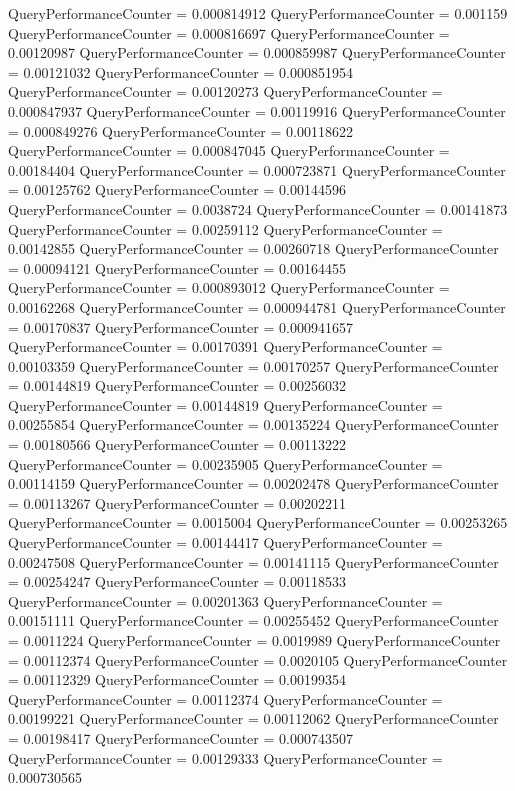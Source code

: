 \documentclass[9pt]{article}
\theoremstyle{plain}
\theoremstyle{definition}
\theoremstyle{remark}
\numberwithin{equation}{section}
\begin{document}
QueryPerformanceCounter  =  0.000814912
QueryPerformanceCounter  =  0.001159
QueryPerformanceCounter  =  0.000816697
QueryPerformanceCounter  =  0.00120987
QueryPerformanceCounter  =  0.000859987
QueryPerformanceCounter  =  0.00121032
QueryPerformanceCounter  =  0.000851954
QueryPerformanceCounter  =  0.00120273
QueryPerformanceCounter  =  0.000847937
QueryPerformanceCounter  =  0.00119916
QueryPerformanceCounter  =  0.000849276
QueryPerformanceCounter  =  0.00118622
QueryPerformanceCounter  =  0.000847045
QueryPerformanceCounter  =  0.00184404
QueryPerformanceCounter  =  0.000723871
QueryPerformanceCounter  =  0.00125762
QueryPerformanceCounter  =  0.00144596
QueryPerformanceCounter  =  0.0038724
QueryPerformanceCounter  =  0.00141873
QueryPerformanceCounter  =  0.00259112
QueryPerformanceCounter  =  0.00142855
QueryPerformanceCounter  =  0.00260718
QueryPerformanceCounter  =  0.00094121
QueryPerformanceCounter  =  0.00164455
QueryPerformanceCounter  =  0.000893012
QueryPerformanceCounter  =  0.00162268
QueryPerformanceCounter  =  0.000944781
QueryPerformanceCounter  =  0.00170837
QueryPerformanceCounter  =  0.000941657
QueryPerformanceCounter  =  0.00170391
QueryPerformanceCounter  =  0.00103359
QueryPerformanceCounter  =  0.00170257
QueryPerformanceCounter  =  0.00144819
QueryPerformanceCounter  =  0.00256032
QueryPerformanceCounter  =  0.00144819
QueryPerformanceCounter  =  0.00255854
QueryPerformanceCounter  =  0.00135224
QueryPerformanceCounter  =  0.00180566
QueryPerformanceCounter  =  0.00113222
QueryPerformanceCounter  =  0.00235905
QueryPerformanceCounter  =  0.00114159
QueryPerformanceCounter  =  0.00202478
QueryPerformanceCounter  =  0.00113267
QueryPerformanceCounter  =  0.00202211
QueryPerformanceCounter  =  0.0015004
QueryPerformanceCounter  =  0.00253265
QueryPerformanceCounter  =  0.00144417
QueryPerformanceCounter  =  0.00247508
QueryPerformanceCounter  =  0.00141115
QueryPerformanceCounter  =  0.00254247
QueryPerformanceCounter  =  0.00118533
QueryPerformanceCounter  =  0.00201363
QueryPerformanceCounter  =  0.00151111
QueryPerformanceCounter  =  0.00255452
QueryPerformanceCounter  =  0.0011224
QueryPerformanceCounter  =  0.0019989
QueryPerformanceCounter  =  0.00112374
QueryPerformanceCounter  =  0.0020105
QueryPerformanceCounter  =  0.00112329
QueryPerformanceCounter  =  0.00199354
QueryPerformanceCounter  =  0.00112374
QueryPerformanceCounter  =  0.00199221
QueryPerformanceCounter  =  0.00112062
QueryPerformanceCounter  =  0.00198417
QueryPerformanceCounter  =  0.000743507
QueryPerformanceCounter  =  0.00129333
QueryPerformanceCounter  =  0.000730565
\end{document}
